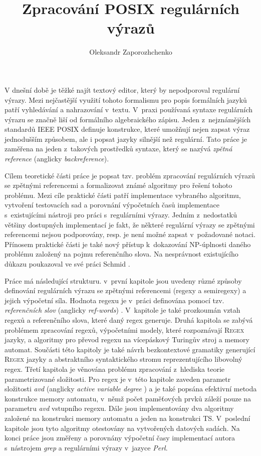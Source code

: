 \documentclass[thesis=B,czech]{FITthesis}[2019/12/23]
\title{Zpracování POSIX regulárních výrazů}
\author{Oleksandr Zaporozhchenko} %
\theoremstyle{definition}
\begin{document}

\begin{introduction}
V dnešní době je těžké najít textový editor, který by nepodporoval regulární výrazy. Mezi nejčastější využití tohoto formalismu pro popis formálních jazyků patří vyhledávání a nahrazování v~textu. V~praxi používaná syntaxe regulárních výrazu se značně liší od formálního algebraického zápisu. Jeden z~nejznámějších standardů IEEE POSIX \cite{posix} definuje konstrukce, které umožňují nejen zapsat výraz jednodušším způsobem, ale i popsat jazyky silnější než regulární. Tato práce je zaměřena na jeden z~takových prostředků syntaxe, který se nazývá \emph{zpětná reference} (anglicky \emph{backreference}).

Cílem teoretické části práce je popsat tzv. problém zpracování regulárních výrazů se zpětnými referencemi a formalizovat známé algoritmy pro řešení tohoto problému. Mezi cíle praktické části patří implementace vybraného algoritmu, vytvoření testovacích sad a porovnání výpočetních časů implementace s~existujícími nástroji pro práci s~regulárními výrazy. Jedním z~nedostatků většiny dostupných implementací je fakt, že některé regulární výrazy se zpětnými referencemi nejsou podporovány, resp. je není možné zapsat v~požadované notaci. Přínosem praktické části je také nový přístup k~dokazování NP-úplnosti daného problému založený na pojmu referenčního slova. Na nesprávnost existujícího důkazu \cite[s. 289]{alfred2014algorithms} poukazoval ve své práci Schmid \cite[s. 83]{schmidregex}.

Práce má následující strukturu. v~první kapitole jsou uvedeny různé způsoby definování regulárních výrazu se zpětnými referencemi (regexy a semiregexy) a jejich výpočetní síla. Hodnota regexu je v~práci definována pomocí tzv. \emph{referenčních slov} (anglicky \emph{ref-words}) \cite{schmidrefwords}. V~kapitole je také prozkoumán vztah regexů a referenčního slova, které daný regex generuje. Druhá kapitola se zabývá problémem zpracování regexů, výpočetními modely, které rozpoznávají \textsc{Regex} jazyky, a algoritmy pro převod regexu na vícepáskový Turingův stroj a memory automat. Součásti této kapitoly je také návrh bezkontextové gramatiky generující \textsc{Regex} jazyky a abstraktního syntaktického stromu reprezentujícího libovolný regex. Třetí kapitola je věnována problému zpracování z~hlediska teorie parametrizované složitosti. Pro regex je v~této kapitole zaveden parametr složitosti \emph{avd} (anglicky \emph{active variable degree} \cite{schmidref}) a je také popsána efektivní metoda konstrukce memory automatu, v~němž počet paměťových prvků záleží pouze na parametru \emph{avd} vstupního regexu. Dále jsou implementovány dva algoritmy založené na konstrukci memory automatu a jeden na konstrukci TS. V~poslední kapitole jsou tyto algoritmy otestovány na vytvořených datových sadách. Na konci práce jsou změřeny a porovnány výpočetní časy implementací autora s~nástrojem \emph{grep} a regulárními výrazy v~jazyce \emph{Perl}. 

\end{introduction}
\end{document}
